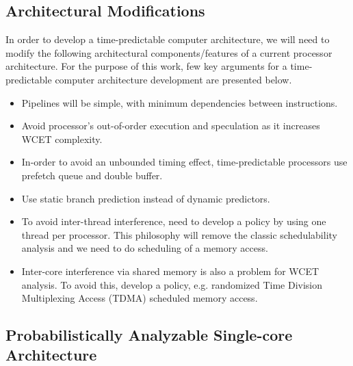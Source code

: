 \subsection{Architectural Modifications}
\label{AM}
In order to develop a time-predictable computer architecture, we will need to modify the following architectural components/features of a current processor architecture.
For the purpose of this work, few key arguments for a time-predictable computer architecture development are presented below. 

\begin{itemize}

\item  Pipelines will be simple, with minimum dependencies between instructions.


\item  Avoid processor's out-of-order execution and speculation as it increases WCET complexity.

\item  In-order to avoid an unbounded timing effect, time-predictable processors use prefetch queue and double buffer.

\item Use static branch prediction instead of dynamic predictors.

\item  To avoid inter-thread interference, need to develop a policy by using one thread per processor. This philosophy will remove the classic schedulability analysis and we need to do scheduling of a memory access.

\item Inter-core interference via shared memory is also a problem for WCET analysis. To avoid this, develop a policy, e.g. randomized Time Division Multiplexing Access (TDMA) scheduled memory access.

\end{itemize}


\subsection{Probabilistically Analyzable Single-core Architecture}

